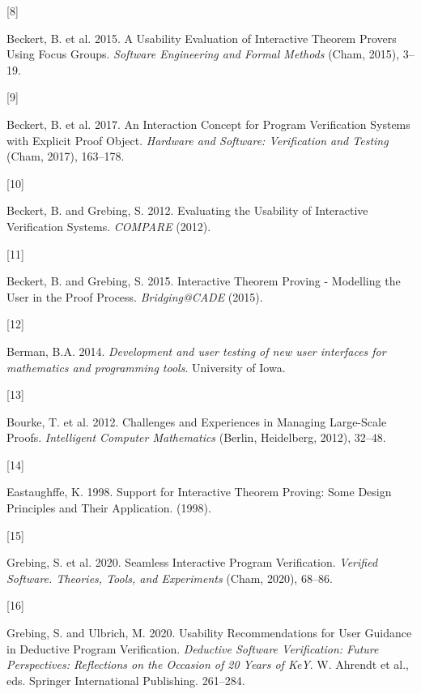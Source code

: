 \documentclass[
]{article}
\newlength{\cslhangindent}
\newlength{\csllabelwidth}
\newlength{\cslentryspacingunit} %
\newenvironment{CSLReferences}[2] %
 {%
  \setlength{\parindent}{0pt}
  \ifodd #1
  \let\oldpar\par
  \def\par{\hangindent=\cslhangindent\oldpar}
  \fi
  \setlength{\parskip}{#2\cslentryspacingunit}
 }%
 {}
\newcommand{\CSLLeftMargin}[1]{\parbox[t]{\csllabelwidth}{#1}}
\newcommand{\CSLRightInline}[1]{\parbox[t]{\linewidth - \csllabelwidth}{#1}\break}
\begin{document}
\begin{CSLReferences}{0}{0}
\leavevmode{}%
\CSLLeftMargin{{[}8{]} }
\CSLRightInline{Beckert, B. et al. 2015. A {Usability} {Evaluation} of
{Interactive} {Theorem} {Provers} {Using} {Focus} {Groups}.
\emph{Software {Engineering} and {Formal} {Methods}} (Cham, 2015),
3--19.}

\leavevmode{}%
\CSLLeftMargin{{[}9{]} }
\CSLRightInline{Beckert, B. et al. 2017. An {Interaction} {Concept} for
{Program} {Verification} {Systems} with {Explicit} {Proof} {Object}.
\emph{Hardware and {Software}: {Verification} and {Testing}} (Cham,
2017), 163--178.}

\leavevmode{}%
\CSLLeftMargin{{[}10{]} }
\CSLRightInline{Beckert, B. and Grebing, S. 2012. Evaluating the
{Usability} of {Interactive} {Verification} {Systems}. \emph{{COMPARE}}
(2012).}

\leavevmode{}%
\CSLLeftMargin{{[}11{]} }
\CSLRightInline{Beckert, B. and Grebing, S. 2015. Interactive {Theorem}
{Proving} - {Modelling} the {User} in the {Proof} {Process}.
\emph{Bridging@{CADE}} (2015).}

\leavevmode{}%
\CSLLeftMargin{{[}12{]} }
\CSLRightInline{Berman, B.A. 2014. \emph{Development and user testing of
new user interfaces for mathematics and programming tools}. University
of Iowa.}

\leavevmode{}%
\CSLLeftMargin{{[}13{]} }
\CSLRightInline{Bourke, T. et al. 2012. Challenges and {Experiences} in
{Managing} {Large}-{Scale} {Proofs}. \emph{Intelligent {Computer}
{Mathematics}} (Berlin, Heidelberg, 2012), 32--48.}

\leavevmode{}%
\CSLLeftMargin{{[}14{]} }
\CSLRightInline{Eastaughffe, K. 1998. Support for {Interactive}
{Theorem} {Proving}: {Some} {Design} {Principles} and {Their}
{Application}. (1998).}

\leavevmode{}%
\CSLLeftMargin{{[}15{]} }
\CSLRightInline{Grebing, S. et al. 2020. Seamless {Interactive}
{Program} {Verification}. \emph{Verified {Software}. {Theories},
{Tools}, and {Experiments}} (Cham, 2020), 68--86.}

\leavevmode{}%
\CSLLeftMargin{{[}16{]} }
\CSLRightInline{Grebing, S. and Ulbrich, M. 2020. Usability
{Recommendations} for {User} {Guidance} in {Deductive} {Program}
{Verification}. \emph{Deductive {Software} {Verification}: {Future}
{Perspectives}: {Reflections} on the {Occasion} of 20 {Years} of {KeY}}.
W. Ahrendt et al., eds. Springer International Publishing. 261--284.}


\end{CSLReferences}
\end{document}
